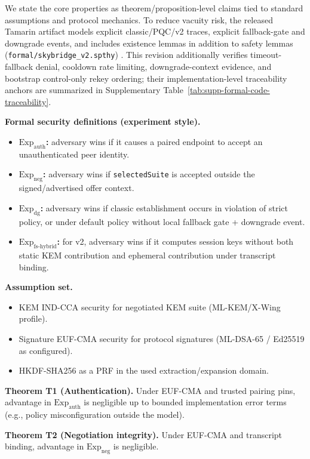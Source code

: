 \documentclass[10pt,journal,compsoc]{IEEEtran}
\providecommand{\tightlist}{%
  \setlength{\itemsep}{0pt}\setlength{\parskip}{0pt}}
\begin{document}
We state the core properties as theorem/proposition-level claims tied to
standard assumptions and protocol mechanics. To reduce vacuity risk, the
released Tamarin artifact models explicit classic/PQC/v2 traces, explicit
fallback-gate and downgrade events, and includes existence lemmas in
addition to safety lemmas (\texttt{formal/skybridge\_v2.spthy}) \cite{ref43}.
This revision additionally verifies
timeout-fallback denial, cooldown rate limiting, downgrade-context
evidence, and bootstrap control-only rekey ordering; their
implementation-level traceability anchors are summarized in
Supplementary Table~\ref{tab:supp-formal-code-traceability}.

\textbf{Formal security definitions (experiment style).}
\begin{itemize}\tightlist
\item \textbf{$\mathrm{Exp}_{\mathrm{auth}}$:} adversary wins if it causes a paired endpoint to accept an unauthenticated peer identity.
\item \textbf{$\mathrm{Exp}_{\mathrm{neg}}$:} adversary wins if \texttt{selectedSuite} is accepted outside the signed/advertised offer context.
\item \textbf{$\mathrm{Exp}_{\mathrm{dg}}$:} adversary wins if classic establishment occurs in violation of strict policy, or under default policy without local fallback gate + downgrade event.
\item \textbf{$\mathrm{Exp}_{\mathrm{fs\mbox{-}hybrid}}$:} for v2, adversary wins if it computes session keys without both static KEM contribution and ephemeral contribution under transcript binding.
\end{itemize}

\textbf{Assumption set.}
\begin{itemize}\tightlist
\item KEM IND-CCA security for negotiated KEM suite (ML-KEM/X-Wing profile).
\item Signature EUF-CMA security for protocol signatures (ML-DSA-65 / Ed25519 as configured).
\item HKDF-SHA256 as a PRF in the used extraction/expansion domain.
\end{itemize}

\textbf{Theorem T1 (Authentication).} Under EUF-CMA and trusted pairing pins,
advantage in $\mathrm{Exp}_{\mathrm{auth}}$ is negligible up to bounded
implementation error terms (e.g., policy misconfiguration outside the model).

\textbf{Theorem T2 (Negotiation integrity).} Under EUF-CMA and transcript
binding, advantage in $\mathrm{Exp}_{\mathrm{neg}}$ is negligible.
\end{document}
